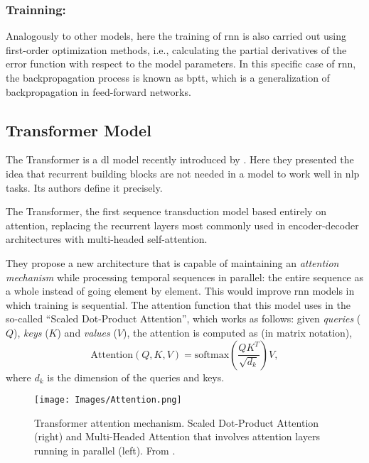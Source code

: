 \subsubsection{Trainning: }%

Analogously to other models, here the training of \gls{rnn} is also carried out
using first-order optimization methods, i.e., calculating the partial
derivatives of the error function with respect to the model parameters. In this
specific case of \gls{rnn}, the backpropagation process is known as \gls{bptt},
which is a generalization of backpropagation in feed-forward networks.


\subsection{Transformer Model}%
\label{sec:transformers}

The Transformer is a \gls{dl} model recently introduced by
. Here they presented the idea that
recurrent building blocks are not needed in a model to work well in \gls{nlp}
tasks. Its authors define it precisely.

\begin{quoteBox}
  The Transformer, the first sequence transduction model based entirely
  on attention, replacing the recurrent layers most commonly used in
  encoder-decoder architectures with multi-headed self-attention.
  \tcblower{}
\end{quoteBox}

They propose a new architecture that is capable of maintaining an
\emph{attention mechanism} while processing
temporal sequences in parallel: the entire sequence as a whole instead of going
element by element.  This would improve \gls{rnn} models in which training is
sequential. The attention function that this model uses in the so-called
``Scaled Dot-Product Attention'', which works as follows: given \emph{queries}
(\(Q\)), \emph{keys} (\(K\)) and \emph{values} (\(V\)), the attention is
computed as (in matrix notation),
\begin{equation}\label{eq:attention}
  \text{Attention}(Q, K, V) =
  \text{softmax}\left(\frac{QK^T}{\sqrt{d_k}}\right)V,
\end{equation}
where \(d_k\) is the dimension of the queries and keys.

\begin{figure}[ht]
  \centering
  \texttt{[image: Images/Attention.png]}
  \caption[Transformer attention mechanism]{Transformer attention
    mechanism. Scaled Dot-Product Attention (right) and Multi-Headed Attention
    that involves attention layers running in parallel (left). From
    .}%
  \label{fig:attention}
\end{figure}

